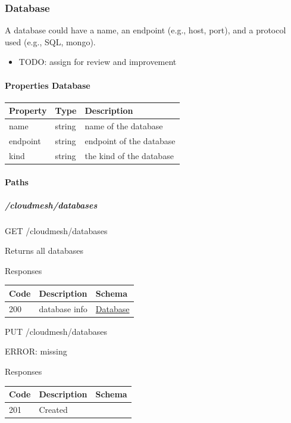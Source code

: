 \documentclass[9pt,]{article}
\providecommand{\tightlist}{%
  \setlength{\itemsep}{0pt}\setlength{\parskip}{0pt}}
\let\oldparagraph\paragraph
\renewcommand{\paragraph}[1]{\oldparagraph{#1}\mbox{}}
\let\oldsubparagraph\subparagraph
\renewcommand{\subparagraph}[1]{\oldsubparagraph{#1}\mbox{}}
\begin{document}
\hypertarget{database}{%
\subsubsection{Database}\label{database}}

A database could have a name, an endpoint (e.g., host, port), and a
protocol used (e.g., SQL, mongo).

\begin{itemize}
\tightlist
\item
  TODO: assign for review and improvement
\end{itemize}

\hypertarget{properties-database}{%
\paragraph{Properties Database}\label{properties-database}}

\begin{longtable}[]{@{}lll@{}}
\toprule
Property & Type & Description\tabularnewline
\midrule
\endhead
name & string & name of the database\tabularnewline
endpoint & string & endpoint of the database\tabularnewline
kind & string & the kind of the database\tabularnewline
\bottomrule
\end{longtable}

\hypertarget{paths-7}{%
\paragraph{Paths}\label{paths-7}}

\hypertarget{cloudmeshdatabases}{%
\subparagraph{/cloudmesh/databases}\label{cloudmeshdatabases}}

GET /cloudmesh/databases

Returns all databases

Responses

\begin{longtable}[]{@{}lll@{}}
\toprule
Code & Description & Schema\tabularnewline
\midrule
\endhead
200 & database info &
\protect\hyperlink{database}{Database}\tabularnewline
\bottomrule
\end{longtable}

PUT /cloudmesh/databases

ERROR: missing

Responses

\begin{longtable}[]{@{}lll@{}}
\toprule
Code & Description & Schema\tabularnewline
\midrule
\endhead
201 & Created &\tabularnewline
\bottomrule
\end{longtable}
\end{document}
